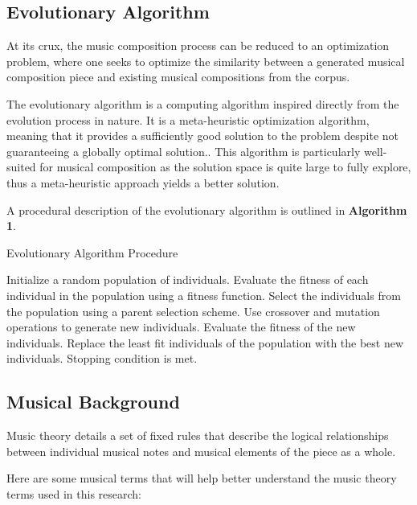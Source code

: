 \documentclass[conference]{IEEEtran}
\begin{document}
\subsection{Evolutionary Algorithm}

At its crux, the music composition process can be reduced to an optimization problem, where one seeks to optimize the similarity between a generated musical composition piece and existing musical compositions from the corpus.

The evolutionary algorithm is a computing algorithm inspired directly from the evolution process in nature. It is a meta-heuristic optimization algorithm, meaning that it provides a sufficiently good solution to the problem despite not guaranteeing a globally optimal solution.\cite{b3}. This algorithm is particularly well-suited for musical composition as the solution space is quite large to fully explore, thus a meta-heuristic approach yields a better solution.

A procedural description of the evolutionary algorithm is outlined in \textbf{Algorithm 1}.

\begin{algorithm}
\caption{Evolutionary Algorithm Procedure}
\begin{algorithmic}[1]
\STATE Initialize a random population of individuals.
\STATE Evaluate the fitness of each individual in the population using a fitness function.
\REPEAT
\STATE Select the individuals from the population using a parent selection scheme.
\STATE Use crossover and mutation operations to generate new individuals.
\STATE Evaluate the fitness of the new individuals.
\STATE Replace the least fit individuals of the population with the best new individuals.
\UNTIL Stopping condition is met.
\end{algorithmic}
\end{algorithm}

\subsection{Musical Background}

Music theory details a set of fixed rules that describe the logical relationships between individual musical notes and musical elements of the piece as a whole.

Here are some musical terms that will help better understand the music theory terms used in this research:
\end{document}
